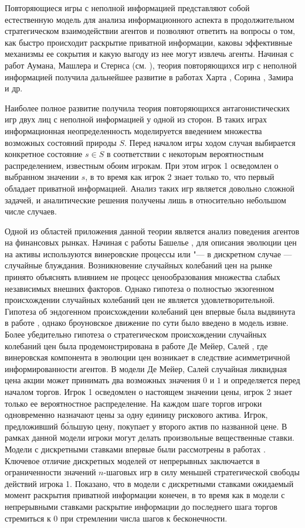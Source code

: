 {\actuality} Повторяющиеся игры с неполной информацией представляют собой
естественную модель для анализа информационного аспекта в продолжительном
стратегическом взаимодействии агентов и позволяют ответить на вопросы о том, как
быстро происходит раскрытие приватной информации, каковы эффективные механизмы
ее сокрытия и какую выгоду из нее могут извлечь агенты. Начиная с работ Аумана,
Машлера и Стернса (см. \cite{aumann95}), теория повторяющихся игр с неполной
информацией получила дальнейшее развитие в работах Харта , Сорина
, Замира  и др.

Наиболее полное развитие получила теория повторяющихся антагонистических игр
двух лиц с неполной информацией у одной из сторон. В таких играх информационная
неопределенность моделируется введением множества возможных состояний природы
$S$. Перед началом игры ходом случая выбирается конкретное состояние $s \in S$ в
соответствии с некоторым вероятностным распределением, известным обоим игрокам.
При этом игрок 1 осведомлен о выбранном значении $s$, в то время как игрок 2
знает только то, что первый обладает приватной информацией. Анализ таких игр
является довольно сложной задачей, и аналитические решения получены лишь в
относительно небольшом числе случаев.

Одной из областей приложения данной теории является анализ поведения агентов на
финансовых рынках. Начиная с работы Башелье \cite{bachelier1900}, для описания
эволюции цен на активы используются винеровские процессы или "--- в дискретном
случае --- случайные блуждания. Возникновение случайных колебаний цен на рынке
принято объяснять влиянием не процесс ценообразования множества слабых
независимых внешних факторов. Однако гипотеза о полностью экзогенном
происхождении случайных колебаний цен не является удовлетворительной. Гипотеза
об эндогенном происхождении колебаний цен впервые была выдвинута в работе
\cite{kyle85}, однако броуновское движение по сути было введено в модель извне.
Более убедительно гипотеза о стратегическом происхождении случайных колебаний
цен была продемонстрирована в работе Де Мейер, Салей \cite{demeyer02}, где
винеровская компонента в эволюции цен возникает в следствие асимметричной
информированности агентов. В модели Де Мейер, Салей случайная ликвидная цена
акции может принимать два возможных значения $0$ и $1$ и определяется перед
началом торгов. Игрок 1 осведомлен о настоящем значении цены, игрок 2 знает
только ее вероятностное распределение. На каждом шаге торгов игроки одновременно
назначают цены за одну единицу рискового актива. Игрок, предложивший б\'{о}льшую
цену, покупает у второго актив по названной цене. В рамках данной модели игроки
могут делать произвольные вещественные ставки. Модели с дискретными ставками
впервые были рассмотрены в работах \cite{demeyer05, domansky07}. Ключевое
отличие дискретных моделей от непрерывных заключается в ограниченности значений
$n$-шаговых игр в силу меньшей стратегической свободы действий игрока 1.
Показано, что в модели с дискретными ставками ожидаемый момент раскрытия
приватной информации конечен, в то время как в модели с непрерывными ставками
раскрытие информации до последнего шага торгов стремиться к $0$ при стремлении
числа шагов к бесконечности.

